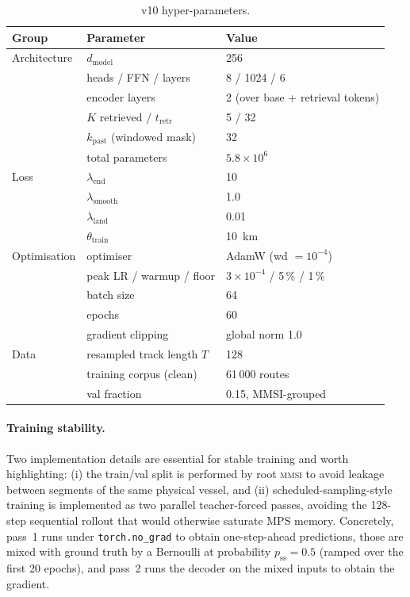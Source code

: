 \documentclass[11pt,a4paper]{article}
\newcommand{\code}[1]{\texttt{\small #1}}
\begin{document}
\begin{table}[h]
\centering
\caption{v10 hyper-parameters.}
\label{tab:hp}
\begin{tabular}{lll}
\toprule
\textbf{Group} & \textbf{Parameter} & \textbf{Value} \\
\midrule
Architecture & $d_{\mathrm{model}}$            & 256   \\
             & heads / FFN / layers            & 8 / 1024 / 6 \\
             & encoder layers                  & 2 (over base + retrieval tokens) \\
             & $K$ retrieved / $t_{\mathrm{retr}}$ & 5 / 32 \\
             & $k_{\mathrm{past}}$ (windowed mask) & 32 \\
             & total parameters                & $5.8 \times 10^6$ \\
\midrule
Loss         & $\lambda_{\mathrm{end}}$        & 10  \\
             & $\lambda_{\mathrm{smooth}}$     & 1.0 \\
             & $\lambda_{\mathrm{land}}$       & 0.01 \\
             & $\theta_{\mathrm{train}}$       & 10~km \\
\midrule
Optimisation & optimiser                       & AdamW (wd $= 10^{-4}$) \\
             & peak LR / warmup / floor        & $3 \times 10^{-4}$ / 5\,\% / 1\,\% \\
             & batch size                      & 64 \\
             & epochs                          & 60 \\
             & gradient clipping               & global norm 1.0 \\
\midrule
Data         & resampled track length $T$      & 128 \\
             & training corpus (clean)         & 61\,000 routes \\
             & val fraction                    & 0.15, MMSI-grouped \\
\bottomrule
\end{tabular}
\end{table}

\paragraph{Training stability.}
Two implementation details are essential for stable training and worth
highlighting: (i) the train/val split is performed by root \textsc{mmsi}
to avoid leakage between segments of the same physical vessel, and
(ii) scheduled-sampling-style training is implemented as two parallel
teacher-forced passes, avoiding the 128-step sequential rollout that
would otherwise saturate MPS memory.  Concretely, pass~1 runs under
\code{torch.no\_grad} to obtain one-step-ahead predictions, those are
mixed with ground truth by a Bernoulli at probability
$p_{\mathrm{ss}} = 0.5$ (ramped over the first 20 epochs), and pass~2
runs the decoder on the mixed inputs to obtain the gradient.
\end{document}
